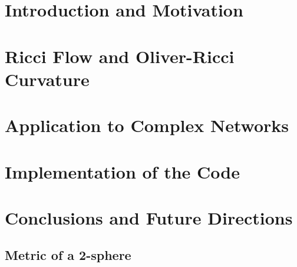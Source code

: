 \documentclass[a4paper,12pt,twoside,online,customfont,custombib,PageStyleI]{Settings/PhDThesisPSnPDF}
\begin{document}
\chapter{Introduction and Motivation}





\chapter{Ricci Flow and Oliver-Ricci Curvature}

\chapter{Application to Complex Networks}

\chapter{Implementation of the Code}

\chapter{Conclusions and Future Directions}

\begin{appendices} %
\chapter{Metric of a 2-sphere}

\end{appendices}
\end{document}
